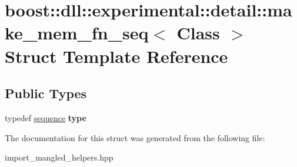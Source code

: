 \hypertarget{a00200}{}\section{boost\+:\+:dll\+:\+:experimental\+:\+:detail\+:\+:make\+\_\+mem\+\_\+fn\+\_\+seq$<$ Class $>$ Struct Template Reference}
\label{a00200}
\subsection*{Public Types}
\begin{DoxyCompactItemize}
\item 
typedef \hyperlink{a00266}{sequence} {\bfseries type}\hypertarget{a00200_a893e92107588ac688d209099dda34d20}{}\label{a00200_a893e92107588ac688d209099dda34d20}

\end{DoxyCompactItemize}


The documentation for this struct was generated from the following file\+:\begin{DoxyCompactItemize}
\item 
import\+\_\+mangled\+\_\+helpers.\+hpp\end{DoxyCompactItemize}
